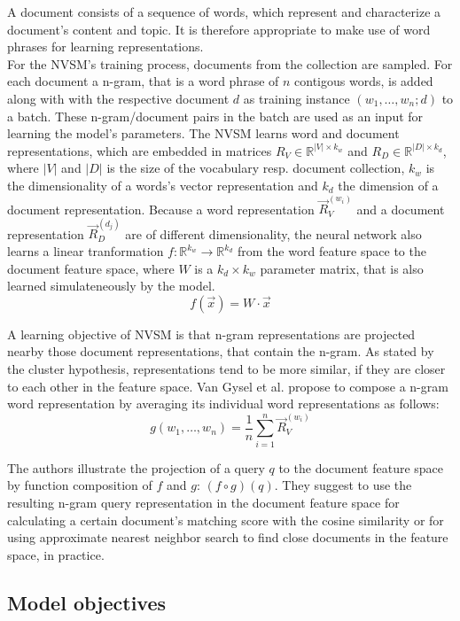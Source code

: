 A document consists of a sequence of words,
    which represent and characterize a document's content and topic.
It is therefore appropriate to make use of word phrases
    for learning representations.\\
For the NVSM's training process, documents from the collection are
    sampled.
For each document a n-gram, that is a word phrase of $n$ 
    contigous words, is added
    along with with the respective document $d$ as
    training instance $(w_1, \ldots, w_n; d)$ to a batch.
These n-gram/document pairs in the batch are used
    as an input for learning the model's parameters.
The NVSM learns word and document representations,
    which are embedded in matrices $R_V \in \mathbb{R}^{|V| \times k_w}$
    and $R_D \in \mathbb{R}^{|D| \times k_d}$, where 
    $|V|$ and $|D|$ is the size of the vocabulary resp. document collection,
    $k_w$ is the dimensionality of a words's vector representation and
    $k_d$ the dimension of a document representation.
Because a word representation $\vec{R}_V^{(w_i)}$
    and a document representation $\vec{R}_D^{(d_j)}$ are of different
    dimensionality, the neural network also learns a linear
    tranformation $f \colon \mathbb{R}^{k_w} \to \mathbb{R}^{k_d}$ 
    from the word feature space to the document feature space,
    where $W$ is a $k_d \times k_w$ parameter matrix, that is 
    also learned simulateneously by the model.
\[
f(\vec{x}) = W \cdot \vec{x}
\]

A learning objective of NVSM is that n-gram representations are projected
    nearby those document representations, that contain the n-gram.
As stated by the cluster hypothesis, representations tend to be 
    more similar, if they are closer to each other in the feature space.
Van Gysel et al. propose to compose a n-gram word representation by
    averaging its individual word representations as follows:
\[
g(w_1, \ldots, w_n) = \frac{1}{n} \sum_{i=1}^{n} \vec{R}_V^{(w_i)}
\]

The authors illustrate the projection of a query $q$ to the document
    feature space by function composition of $f$ and $g$: $(f \circ g)(q)$.
They suggest to use the resulting n-gram query representation in the document 
    feature space for calculating a certain document's matching score
    with the cosine similarity or for using approximate 
    nearest neighbor search to find close documents in the 
    feature space, in practice.\cite{van-gysel:2017:neural-vector-spaces}

\subsection*{Model objectives}

